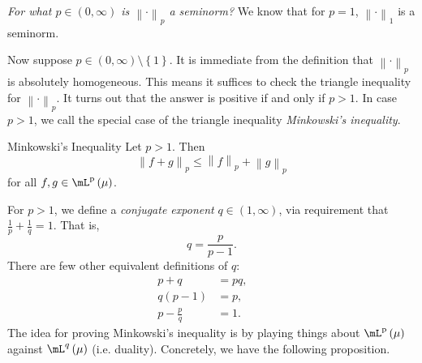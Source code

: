 \documentclass[pmath450]{subfiles}
\begin{document}
    \np \textit{For what $p\in\left( 0,\infty \right)$ is $\left\lVert \cdot\right\rVert_p$ a seminorm?} We know that for $p=1$, $\left\lVert \cdot \right\rVert_{1}$ is a seminorm. 

    Now suppose $p\in\left( 0,\infty \right)\setminus \left\lbrace 1 \right\rbrace$. It is immediate from the definition that $\left\lVert \cdot\right\rVert_p$ is absolutely homogeneous. This means it suffices to check the triangle inequality for $\left\lVert \cdot\right\rVert_p$. It turns out that the answer is positive if and only if $p>1$. In case $p>1$, we call the special case of the triangle inequality \textit{Minkowski's inequality}.

    \begin{prop}{Minkowski's Inequality}
        Let $p>1$. Then
        \begin{equation*}
            \left\lVert f+g\right\rVert_p \leq \left\lVert f\right\rVert_p + \left\lVert g\right\rVert_p
        \end{equation*}
        for all $f,g\in\lp\left( \mu \right)$.
    \end{prop}
    
    \placeqed[Postponed]

    \np For $p>1$, we define a \textit{conjugate exponent} $q\in\left( 1,\infty \right)$, via requirement that $\frac{1}{p}+\frac{1}{q}=1$. That is,
    \begin{equation*}
        q = \frac{p}{p-1}.
    \end{equation*}
    There are few other equivalent definitions of $q$:
    \begin{equation*}
        \begin{aligned}
            p+q & = pq, && \\
            q\left( p-1 \right) & = p, && \\
            p-\frac{p}{q} & = 1.
        \end{aligned} 
    \end{equation*}
    The idea for proving Minkowski's inequality is by playing things about $\lp\left( \mu \right)$ against $\mL^q\left( \mu \right)$ (i.e. duality). Concretely, we have the following proposition.
\end{document}
